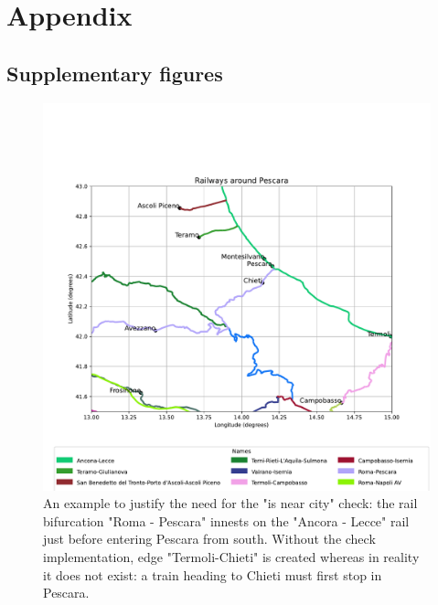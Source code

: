 \section*{Appendix}
\subsection*{Supplementary figures}
\begin{figure}[H]
    \centering
    \includegraphics[width= \textwidth]{latex_source/images/railways/pescara_area.pdf}
    \caption{An example to justify the need for the "is near city" check: the rail bifurcation "Roma - Pescara" innests on the "Ancora - Lecce" rail just before entering Pescara from south. Without the check implementation, edge "Termoli-Chieti" is created whereas in reality it does not exist: a train heading to Chieti must first stop in Pescara. }
    \label{fig:pescara_area}
\end{figure}
